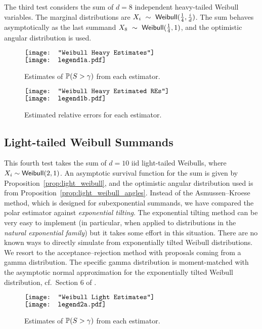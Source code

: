 The third test considers the sum of $d=8$ independent heavy-tailed Weibull variables. The marginal distributions are $X_i~\sim~\mathsf{Weibull}(\frac{1}{4}, \frac{i}{d})$. The sum behaves asymptotically as the last summand $X_8~\sim~\mathsf{Weibull}(\frac{1}{4}, 1)$, and the optimistic angular distribution is used.
\begin{figure}[H]
	\centering
	$\vcenter{\hbox{\texttt{[image: "Weibull Heavy Estimates"]}}}$
 	\hspace*{.1in}
 	$\vcenter{\hbox{\texttt{[image: legend1a.pdf]}}}$
	\caption{Estimates of $\operatorname{{\mathbb P}}(S > \gamma)$ from each estimator.}
\end{figure}

\begin{figure}[H]
	\centering
	$\vcenter{\hbox{\texttt{[image: "Weibull Heavy Estimated REs"]}}}$
 	\hspace*{.1in}
 	$\vcenter{\hbox{\texttt{[image: legend1b.pdf]}}}$
	\caption{Estimated relative errors for each estimator.}
\end{figure}

\subsection{Light-tailed Weibull Summands}

This fourth test takes the sum of $d=10$ iid light-tailed Weibulls, where $X_i \sim \mathsf{Weibull}(2, 1)$. An asymptotic survival function for the sum is given by Proposition~\ref{prop:light_weibull}, and the optimistic angular distribution used is from Proposition~\ref{prop:light_weibull_angles}. Instead of the Asmussen--Kroese method, which is designed for subexponential summands, we have compared the polar estimator against \emph{exponential tilting}. The exponential tilting method can be very easy to implement (in particular, when applied to distributions in the \emph{natural exponential family}) but it takes some effort in this situation. There are no known ways to directly simulate from exponentially tilted Weibull distributions. We resort to the acceptance--rejection method with proposals coming from a gamma distribution. The specific gamma distribution is moment-matched with the asymptotic normal approximation for the exponentially tilted Weibull distribution, cf.\ Section 6 of \cite{asmussen2017tail}.

\begin{figure}[H]
	\centering
	$\vcenter{\hbox{\texttt{[image: "Weibull Light Estimates"]}}}$
 	\hspace*{.1in}
 	$\vcenter{\hbox{\texttt{[image: legend2a.pdf]}}}$
	\caption{Estimates of $\operatorname{{\mathbb P}}(S > \gamma)$ from each estimator.}
\end{figure}

